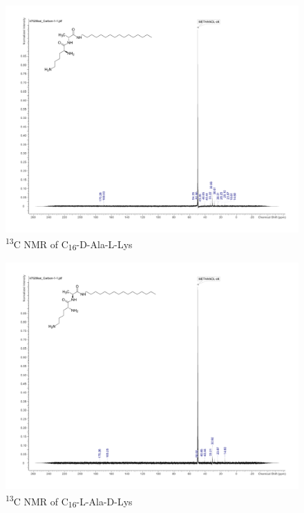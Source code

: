\begin{figure}[ht!]
\centering
\includegraphics[scale=0.47]{13CNMR/KAT1_22_13C.pdf}
\caption{\textsuperscript{13}C NMR of C\textsubscript{16}-D-Ala-L-Lys}
\label{KAT1.22_13CNMR}
\end{figure}
\newpage
\begin{figure}[ht!]
\centering
\includegraphics[scale=0.47]{13CNMR/KAT1_30_13C.pdf}
\caption{\textsuperscript{13}C NMR of C\textsubscript{16}-L-Ala-D-Lys}
\label{KAT1.30_13CNMR}
\end{figure}

